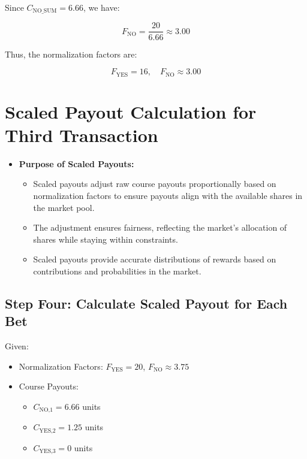 \documentclass{article}
\begin{document}
Since \( C_{\text{NO\_SUM}} = 6.66 \), we have:

\[
F_{\text{NO}} = \frac{20}{6.66} \approx 3.00
\]

Thus, the normalization factors are:

\[
F_{\text{YES}} = 16, \quad F_{\text{NO}} \approx 3.00
\]

\begin{center}
\end{center}

\newpage


\section*{Scaled Payout Calculation for Third Transaction}

\begin{itemize}
    \item \textbf{Purpose of Scaled Payouts:}
    \begin{itemize}
        \item Scaled payouts adjust raw course payouts proportionally based on normalization factors to ensure payouts align with the available shares in the market pool.
        \item The adjustment ensures fairness, reflecting the market's allocation of shares while staying within constraints.
        \item Scaled payouts provide accurate distributions of rewards based on contributions and probabilities in the market.
    \end{itemize}
\end{itemize}

\subsection*{Step Four: Calculate Scaled Payout for Each Bet}

Given:
\begin{itemize}
    \item Normalization Factors: \( F_{\text{YES}} = 20 \), \( F_{\text{NO}} \approx 3.75 \)
    \item Course Payouts:
    \begin{itemize}
        \item \( C_{\text{NO,1}} = 6.66 \) units
        \item \( C_{\text{YES,2}} = 1.25 \) units
        \item \( C_{\text{YES,3}} = 0 \) units
    \end{itemize}
\end{itemize}
\end{document}
